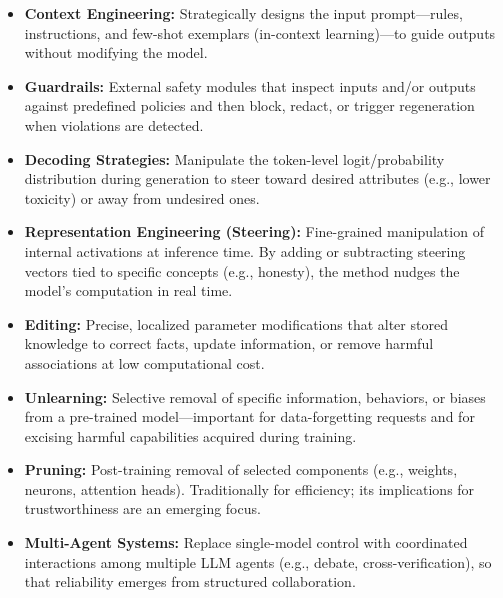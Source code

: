 \begin{itemize}
    \item \textbf{Context Engineering:} Strategically designs the input prompt—rules, instructions, and few-shot exemplars (in-context learning)—to guide outputs without modifying the model.
    \item \textbf{Guardrails:} External safety modules that inspect inputs and/or outputs against predefined policies and then block, redact, or trigger regeneration when violations are detected.
    \item \textbf{Decoding Strategies:} Manipulate the token-level logit/probability distribution during generation to steer toward desired attributes (e.g., lower toxicity) or away from undesired ones.
    \item \textbf{Representation Engineering (Steering):} Fine-grained manipulation of internal activations at inference time. By adding or subtracting steering vectors tied to specific concepts (e.g., honesty), the method nudges the model’s computation in real time.
    \item \textbf{Editing:} Precise, localized parameter modifications that alter stored knowledge to correct facts, update information, or remove harmful associations at low computational cost.
    \item \textbf{Unlearning:} Selective removal of specific information, behaviors, or biases from a pre-trained model—important for data-forgetting requests and for excising harmful capabilities acquired during training.
    \item \textbf{Pruning:} Post-training removal of selected components (e.g., weights, neurons, attention heads). Traditionally for efficiency; its implications for trustworthiness are an emerging focus.
    \item \textbf{Multi-Agent Systems:} Replace single-model control with coordinated interactions among multiple LLM agents (e.g., debate, cross-verification), so that reliability emerges from structured collaboration.
\end{itemize}

